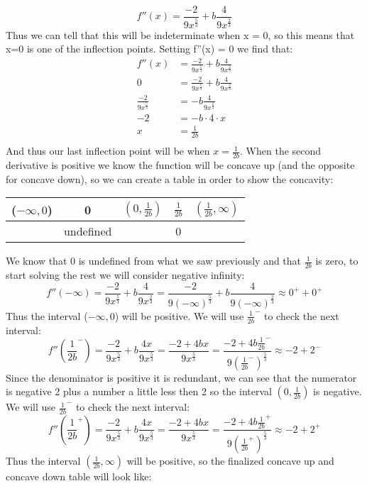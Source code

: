 \documentclass[11pt]{article}
\begin{document}
\[ f''(x)  = \frac{-2}{9x^{\frac{5}{3}}} + b\frac{4}{9x^{\frac{2}{3}}}\]
Thus we can tell that this will be indeterminate when x = 0, so this means that x=0 is one of the inflection points. Setting f''(x) = 0 we find that:
\begin{align*}
f''(x) & = \frac{-2}{9x^{\frac{5}{3}}} + b\frac{4}{9x^{\frac{2}{3}}} \\
0 & = \frac{-2}{9x^{\frac{5}{3}}} + b\frac{4}{9x^{\frac{2}{3}}} \\
 \frac{-2}{9x^{\frac{5}{3}}}  & = -b\frac{4}{9x^{\frac{2}{3}}} \\
-2  & = -b\cdot4\cdot x \\
x &= \frac{1}{2b} \\
\end{align*}
And thus our last inflection point will be when $x = \frac{1}{2b}$. When the second derivative is positive we know the function will be concave up (and the opposite for concave down), so we can create a table in order to show the concavity:
\begin{center}
 \begin{tabular}{||c c c c c||} 
 \hline
 ($-\infty, 0$) & 0 & $(0, \frac{1}{2b})$ &  $\frac{1}{2b}$ & $( \frac{1}{2b},\infty)$  \\ [0.5ex] 
 \hline\hline
&  undefined &  & 0 &\\ 
 \hline
\end{tabular}
\end{center}
We know that 0 is undefined from what we saw previously and that $\frac{1}{2b}$ is zero, to start solving the rest we will consider negative infinity:
\[ f''(-\infty) = \frac{-2}{9x^{\frac{5}{3}}} + b\frac{4}{9x^{\frac{2}{3}}} = \frac{-2}{9(-\infty)^{\frac{5}{3}}} + b\frac{4}{9(-\infty)^{\frac{2}{3}}} \approx 0^+ + 0^+\]
Thus the interval  ($-\infty, 0$) will be positive. We will use $\frac{1}{2b}^-$ to check the next interval:
\[ f''(\frac{1}{2b}^-) = \frac{-2}{9x^{\frac{5}{3}}} + b\frac{4x}{9x^{\frac{5}{3}}} = \frac{-2+4bx}{9x^{\frac{5}{3}}} =   \frac{-2+4b\frac{1}{2b}^-}{9(\frac{1}{2b}^-)^{\frac{5}{3}}} \approx -2 + 2^-\]
Since the denominator is positive it is redundant, we can see that the numerator is negative 2 plus a number a little less then 2 so the interval $(0, \frac{1}{2b})$ is negative. We will use $\frac{1}{2b}^-$ to check the next interval:
\[ f''(\frac{1}{2b}^+) = \frac{-2}{9x^{\frac{5}{3}}} + b\frac{4x}{9x^{\frac{5}{3}}} = \frac{-2+4bx}{9x^{\frac{5}{3}}} =   \frac{-2+4b\frac{1}{2b}^+}{9(\frac{1}{2b}^+)^{\frac{5}{3}}} \approx -2 + 2^+\]
Thus the interval $(\frac{1}{2b},\infty)$ will be positive, so the finalized concave up and concave down table will look like:
\end{document}

